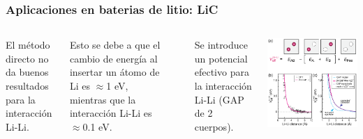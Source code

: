 \documentclass[aspectratio=169]{beamer}
\begin{document}
    \begin{frame}
        \frametitle{Aplicaciones en baterias de litio: LiC}
        
        \begin{columns}
            El método directo no da buenos resultados para la interacción Li-Li.

            Esto se debe a que el cambio de energía al insertar un átomo de Li
            es $\approx$1 eV, mientras que la interacción Li-Li es $\approx$0.1 eV.

            \ \pause 

            Se introduce un potencial efectivo para la interacción Li-Li (GAP de 
            2 cuerpos).

            \begin{center}
                \includegraphics[width=\columnwidth]{LiC-LiLi_efectivo.png}
            \end{center}
        \end{columns}

    \end{frame}
\end{document}
